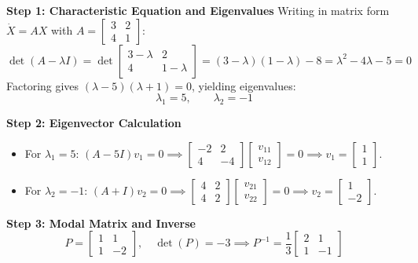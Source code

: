 \documentclass[12pt,a4paper]{article}
\theoremstyle{definition}
\theoremstyle{plain}
\begin{document}
\textbf{Step 1: Characteristic Equation and Eigenvalues}
Writing in matrix form $\dot{X} = A X$ with $A = \begin{bmatrix} 3 & 2 \\ 4 & 1 \end{bmatrix}$:
\[
\det(A - \lambda I) = \det \begin{bmatrix} 3-\lambda & 2 \\ 4 & 1-\lambda \end{bmatrix} = (3-\lambda)(1-\lambda) - 8 = \lambda^2 - 4\lambda - 5 = 0
\]
Factoring gives $(\lambda - 5)(\lambda + 1) = 0$, yielding eigenvalues:
\[
\lambda_1 = 5, \qquad \lambda_2 = -1
\]

\textbf{Step 2: Eigenvector Calculation}
\begin{itemize}
    \item For $\lambda_1 = 5$: $(A - 5I) v_1 = 0 \implies \begin{bmatrix} -2 & 2 \\ 4 & -4 \end{bmatrix} \begin{bmatrix} v_{11} \\ v_{12} \end{bmatrix} = 0 \implies v_1 = \begin{bmatrix} 1 \\ 1 \end{bmatrix}$.
    \item For $\lambda_2 = -1$: $(A + I) v_2 = 0 \implies \begin{bmatrix} 4 & 2 \\ 4 & 2 \end{bmatrix} \begin{bmatrix} v_{21} \\ v_{22} \end{bmatrix} = 0 \implies v_2 = \begin{bmatrix} 1 \\ -2 \end{bmatrix}$.
\end{itemize}

\textbf{Step 3: Modal Matrix and Inverse}
\[
P = \begin{bmatrix} 1 & 1 \\ 1 & -2 \end{bmatrix}, \quad \det(P) = -3 \implies P^{-1} = \frac{1}{3} \begin{bmatrix} 2 & 1 \\ 1 & -1 \end{bmatrix}
\]
\end{document}
